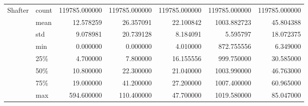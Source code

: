 \begin{tabular}{llrrrrr}
Shafter & count &  119785.000000 &  119785.000000 &  119785.000000 &  119785.000000 &  119785.000000 \\
        & mean &      12.578259 &      26.357091 &      22.100842 &    1003.882723 &      45.804388 \\
        & std &       9.078981 &      20.739128 &       8.184091 &       5.595797 &      18.072375 \\
        & min &       0.000000 &       0.000000 &       4.010000 &     872.755556 &       6.349000 \\
        & 25\% &       4.700000 &       7.800000 &      16.155556 &     999.750000 &      30.585000 \\
        & 50\% &      10.800000 &      22.300000 &      21.040000 &    1003.990000 &      46.763000 \\
        & 75\% &      19.000000 &      41.200000 &      27.200000 &    1007.400000 &      60.965000 \\
        & max &     594.600000 &     110.400000 &      47.700000 &    1019.580000 &      85.047000 \\
\bottomrule
\end{tabular}
